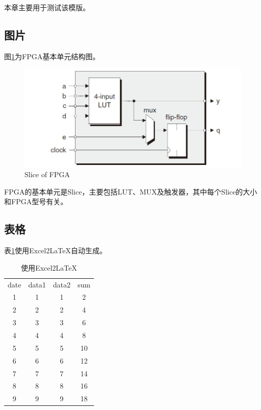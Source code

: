 本章主要用于测试该模版。

\subsection{图片}
图\ref{f1}为FPGA基本单元结构图。
\begin{figure}[H] %
    \centering
    \includegraphics{img/FPGA.jpg} %
    \caption{Slice of FPGA} %
    \label{f1} %
\end{figure}

FPGA的基本单元是Slice，主要包括LUT、MUX及触发器，其中每个Slice的大小和FPGA型号有关。

\subsection{表格}
表\ref{t1}使用Excel2LaTeX自动生成。

\begin{table}[htbp]
    \centering
    \caption{使用Excel2LaTeX}
      \begin{tabular}{|c|ccc|}
        \hline
        date  & data1 & data2 & sum \\
        1     & 1     & 1     & 2 \\
        2     & 2     & 2     & 4 \\
        3     & 3     & 3     & 6 \\
        4     & 4     & 4     & 8 \\
        5     & 5     & 5     & 10 \\
        6     & 6     & 6     & 12 \\
        7     & 7     & 7     & 14 \\
        8     & 8     & 8     & 16 \\
        9     & 9     & 9     & 18 \\
        \hline
      \end{tabular}%
    \label{t1}%
\end{table}%
  
